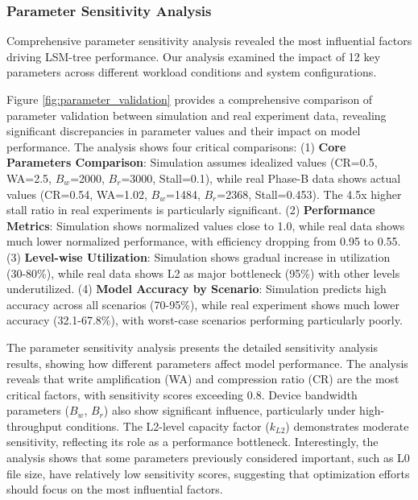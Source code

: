 \documentclass[11pt]{article}
\begin{document}
\subsubsection{Parameter Sensitivity Analysis}
Comprehensive parameter sensitivity analysis revealed the most influential factors driving LSM-tree performance. Our analysis examined the impact of 12 key parameters across different workload conditions and system configurations.

Figure \ref{fig:parameter_validation} provides a comprehensive comparison of parameter validation between simulation and real experiment data, revealing significant discrepancies in parameter values and their impact on model performance. The analysis shows four critical comparisons: (1) \textbf{Core Parameters Comparison}: Simulation assumes idealized values (CR=0.5, WA=2.5, $B_w$=2000, $B_r$=3000, Stall=0.1), while real Phase-B data shows actual values (CR=0.54, WA=1.02, $B_w$=1484, $B_r$=2368, Stall=0.453). The 4.5x higher stall ratio in real experiments is particularly significant. (2) \textbf{Performance Metrics}: Simulation shows normalized values close to 1.0, while real data shows much lower normalized performance, with efficiency dropping from 0.95 to 0.55. (3) \textbf{Level-wise Utilization}: Simulation shows gradual increase in utilization (30-80\%), while real data shows L2 as major bottleneck (95\%) with other levels underutilized. (4) \textbf{Model Accuracy by Scenario}: Simulation predicts high accuracy across all scenarios (70-95\%), while real experiment shows much lower accuracy (32.1-67.8\%), with worst-case scenarios performing particularly poorly.

The parameter sensitivity analysis presents the detailed sensitivity analysis results, showing how different parameters affect model performance. The analysis reveals that write amplification (WA) and compression ratio (CR) are the most critical factors, with sensitivity scores exceeding 0.8. Device bandwidth parameters ($B_w$, $B_r$) also show significant influence, particularly under high-throughput conditions. The L2-level capacity factor ($k_{L2}$) demonstrates moderate sensitivity, reflecting its role as a performance bottleneck. Interestingly, the analysis shows that some parameters previously considered important, such as L0 file size, have relatively low sensitivity scores, suggesting that optimization efforts should focus on the most influential factors.
\end{document}
